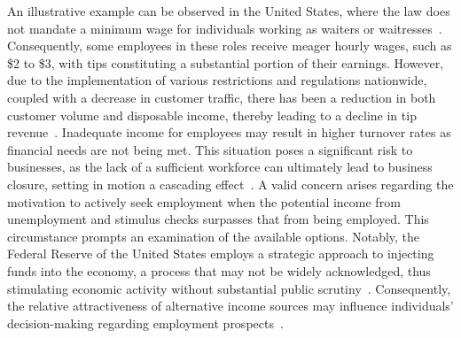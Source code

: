 An illustrative example can be observed in the United States, where the law does not mandate a minimum wage for individuals working as waiters
or waitresses~\cite{dol}. Consequently, some employees in these roles receive meager hourly wages, such as \$2 to \$3, with tips constituting
a substantial portion of their earnings. However, due to the implementation of various restrictions and regulations nationwide, coupled with a
decrease in customer traffic, there has been a reduction in both customer volume and disposable income, thereby leading to a decline in tip
revenue~\cite{bls2022}. Inadequate income for employees may result in higher turnover rates as financial needs are not being met. This situation
poses a significant risk to businesses, as the lack of a sufficient workforce can ultimately lead to business closure, setting in motion a
cascading effect~\cite{azar2020}. A valid concern arises regarding the motivation to actively seek employment when the potential income from
unemployment and stimulus checks surpasses that from being employed. This circumstance prompts an examination of the available options. Notably,
the Federal Reserve of the United States employs a strategic approach to injecting funds into the economy, a process that may not be widely
acknowledged, thus stimulating economic activity without substantial public scrutiny~\cite{frb}. Consequently, the relative attractiveness of
alternative income sources may influence individuals' decision-making regarding employment prospects~\cite{cbo2021}.

